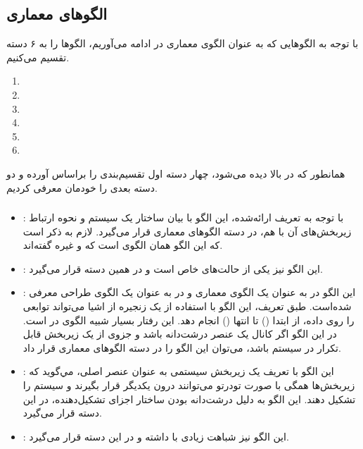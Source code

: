 \subsection{الگوهای معماری}
\begin{RTL}
با توجه به الگوهایی که به عنوان الگوی معماری در ادامه می‌آوریم،
الگوها را به ۶ دسته تقسیم می‌کنیم.
\end{RTL}
\begin{enumerate}
    \item {}
    \item {}
    \item {}
    \item {}
    \item {}
    \item {}
\end{enumerate}
\begin{RTL}
همانطور که در بالا دیده می‌شود، چهار دسته اول تقسیم‌بندی را براساس
\cite{ref6} آورده و دو دسته بعدی را خودمان معرفی کردیم.
\end{RTL}
\subsubsection{}
\begin{itemize}
\item {}: %
با توجه به تعریف ارائه‌شده، این الگو با بیان ساختار یک سیستم و نحوه
ارتباط زیربخش‌های آن با هم، در دسته الگوهای معماری قرار می‌گیرد.
لازم به ذکر است که این الگو همان الگوی  است
که  و غیره \cite{ref6} گفته‌اند.
\item {}: %
این الگو نیز یکی از حالت‌های خاص 
است و در همین دسته قرار می‌گیرد.
\item {}: %
این الگو در \cite{ref4} به عنوان یک الگوی معماری و
در \cite{ref1} به عنوان یک الگوی طراحی معرفی شده‌است.
طبق تعریف، این الگو با استفاده از یک زنجیره از اشیا می‌تواند توابعی را روی
داده، از ابتدا () تا انتها () انجام دهد.
این رفتار بسیار شبیه الگوی  در \cite{ref6}
است. در این الگو اگر کانال یک عنصر درشت‌دانه باشد و جزوی از یک زیربخش
قابل تکرار در سیستم باشد، می‌توان این الگو را در دسته الگوهای معماری قرار داد.
\item {}: %
این الگو با تعریف یک زیربخش سیستمی به عنوان عنصر اصلی، مي‌گوید که
زیربخش‌ها همگی با صورت تودرتو می‌توانند درون یکدیگر قرار بگیرند و سیستم را
تشکیل دهند. این الگو به دلیل درشت‌دانه بودن ساختار اجزای تشکیل‌دهنده،
در این دسته قرار می‌گیرد.
\item {}: %
این الگو نیز شباهت زیادی با  داشته
و در این دسته قرار می‌گیرد.
\end{itemize}

